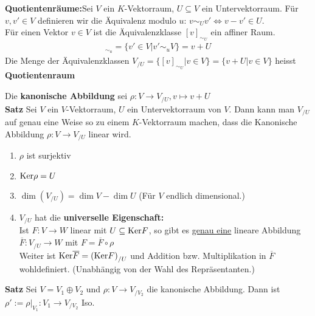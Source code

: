 \begin{mdframed}
\textbf{Quotientenräume:}\quad Sei $V$ ein $K$-Vektorraum, $U \subseteq V$ ein Untervektorraum. Für $v, v' \in V$ definieren wir die Äquivalenz modulo $u$: $v \sim_U v' \Leftrightarrow v-v' \in U$.\\
Für einen Vektor $v \in V$ ist die Äquivalenzklasse $[v]_{\sim_U}$ ein affiner Raum. 
\begin{align*}
    [v]_{\sim_u} = \{v' \in V \big\vert v' \sim_u V\} = v + U
\end{align*}
Die Menge der Äquivalenzklassen $V_{/U} = \{[v]_{\sim_U} \big\vert v \in V\} = \{v + U \big\vert v \in V\}$ heisst \textbf{Quotientenraum}
\end{mdframed}
Die \textbf{kanonische Abbildung} sei $\rho: V \rightarrow V_{/U}, v \mapsto v + U$\\
\textbf{Satz} Sei $V$ ein $V$-Vektorraum, $U$ ein Untervektorraum von $V$. Dann kann man $V_{/U}$ auf genau eine Weise so zu einem $K$-Vektorraum machen, dass die Kanonische Abbildung $\rho: V \rightarrow V_{/U}$ linear wird.
\begin{enumerate}[{(}1{.)}]
    \item	$\rho$ ist surjektiv
    
    \item $\text{Ker} \rho = U$
    
    \item $\dim \left(V_{/U}\right) = \dim V - \dim U$ (Für $V$ endlich dimensional.)
    
    \item $V_{/U}$ hat die \textbf{universelle Eigenschaft:}\\
    Ist $F: V \rightarrow W$ linear mit $U \subseteq \text{Ker} F$, so gibt es \underline{genau eine} lineare Abbildung $\overline{F}: V_{/U} \rightarrow W$ mit $F = \overline{F} \circ \rho$\\
    Weiter ist $\text{Ker} \overline{F} = \left(\text{Ker} F\right)_{/U}$ und Addition bzw. Multiplikation in $\overline{F}$ wohldefiniert. (Unabhängig von der Wahl des Repräsentanten.) 
\end{enumerate}
\textbf{Satz} Sei $V = V_1 \oplus V_2$ und $\rho: V \rightarrow V_{/V_2}$ die kanonische Abbildung. Dann ist $\rho':= \rho |_{V_1}: V_1 \rightarrow V_{/V_2}$ Iso.\\

